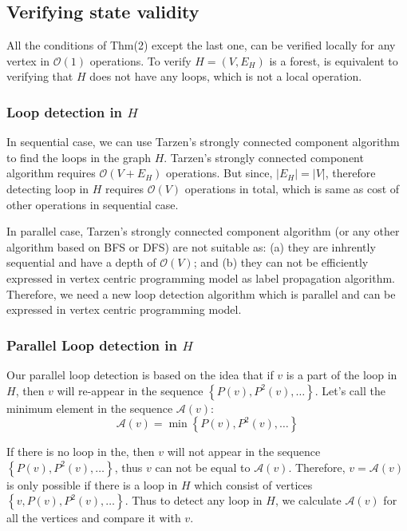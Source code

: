 \subsection{Verifying state validity}

All the conditions of Thm(2) except the last one, can be verified
locally for any vertex in $\mathcal{O}(1)$ operations. To verify
$H=(V,E_{H})$ is a forest, is equivalent to verifying that $H$ does
not have any loops, which is not a local operation.

\subsubsection{Loop detection in $H$}

In sequential case, we can use Tarzen's strongly connected component
algorithm to find the loops in the graph $H$. Tarzen's strongly connected
component algorithm requires $\mathcal{O}(V+E_{H})$ operations. But
since, $|E_{H}|=|V|$, therefore detecting loop in $H$ requires $\mathcal{O}(V)$
operations in total, which is same as cost of other operations in
sequential case.

In parallel case, Tarzen's strongly connected component algorithm
(or any other algorithm based on BFS or DFS) are not suitable as:
(a) they are inhrently sequential and have a depth of $\mathcal{O}(V)$;
and (b) they can not be efficiently expressed in vertex centric programming
model as label propagation algorithm. Therefore, we need a new loop
detection algorithm which is parallel and can be expressed in vertex
centric programming model. 

\subsubsection{Parallel Loop detection in $H$}

\begin{algorithm}
\caption{}
\end{algorithm}

Our parallel loop detection is based on the idea that if $v$ is a
part of the loop in $H$, then $v$ will re-appear in the sequence
$\left\{ P(v),P^{2}(v),\ldots\right\} $. Let's call the minimum element
in the sequence $\mathcal{A}(v)$:
\[
\mathcal{A}(v)=\min\left\{ P(v),P^{2}(v),\ldots\right\} 
\]

If there is no loop in the, then $v$ will not appear in the sequence
$\left\{ P(v),P^{2}(v),\ldots\right\} $, thus $v$ can not be equal
to $\mathcal{A}(v)$. Therefore, $v=\mathcal{A}(v)$ is only possible
if there is a loop in $H$ which consist of vertices $\left\{ v,P(v),P^{2}(v),\ldots\right\} $.
Thus to detect any loop in $H$, we calculate $\mathcal{A}(v)$ for
all the vertices and compare it with $v$. 

